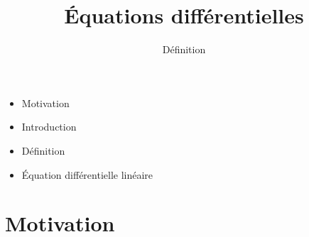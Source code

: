 


\newcommand{\alenvers}[1]{\rotatebox[origin=c]{180}{#1}}






\title{{\bf \'Equations différentielles}}
\subtitle{Définition}

\begin{frame}
  
  \debutmontitre

  \pause

{\footnotesize
\hfill
{}
\begin{minipage}{0.6\textwidth}
  \begin{itemize}
    \item<3-> Motivation
    \item<4-> Introduction
    \item<5-> Définition
    \item<6-> \'Equation différentielle linéaire
  \end{itemize}
\end{minipage}
}

\end{frame}

\setcounter{framenumber}{0}

\section*{Motivation}

